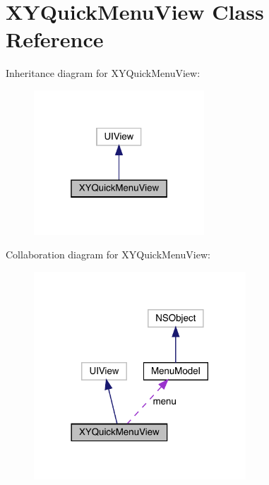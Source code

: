 \hypertarget{interface_x_y_quick_menu_view}{}\section{X\+Y\+Quick\+Menu\+View Class Reference}
\label{interface_x_y_quick_menu_view}


Inheritance diagram for X\+Y\+Quick\+Menu\+View\+:\nopagebreak
\begin{figure}[H]
\begin{center}
\leavevmode
\includegraphics[width=181pt]{interface_x_y_quick_menu_view__inherit__graph}
\end{center}
\end{figure}


Collaboration diagram for X\+Y\+Quick\+Menu\+View\+:\nopagebreak
\begin{figure}[H]
\begin{center}
\leavevmode
\includegraphics[width=225pt]{interface_x_y_quick_menu_view__coll__graph}
\end{center}
\end{figure}
